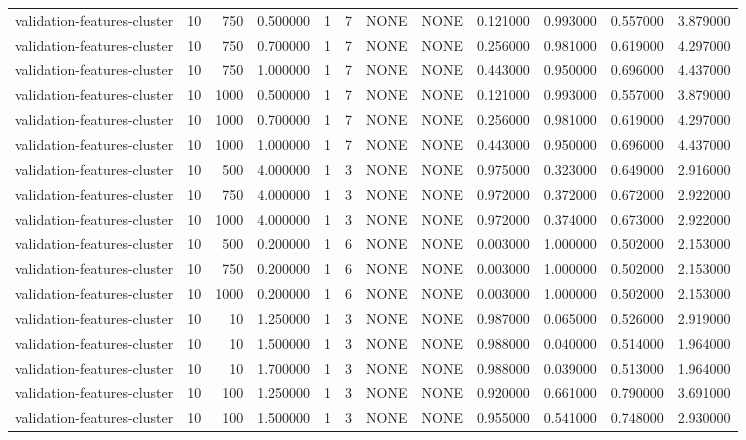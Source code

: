 \begin{tabular}{lrrrllllrrrr}
validation-features-cluster & 10 & 750 & 0.500000 & 1 & 7 & NONE & NONE & 0.121000 & 0.993000 & 0.557000 & 3.879000 \\
validation-features-cluster & 10 & 750 & 0.700000 & 1 & 7 & NONE & NONE & 0.256000 & 0.981000 & 0.619000 & 4.297000 \\
validation-features-cluster & 10 & 750 & 1.000000 & 1 & 7 & NONE & NONE & 0.443000 & 0.950000 & 0.696000 & 4.437000 \\
validation-features-cluster & 10 & 1000 & 0.500000 & 1 & 7 & NONE & NONE & 0.121000 & 0.993000 & 0.557000 & 3.879000 \\
validation-features-cluster & 10 & 1000 & 0.700000 & 1 & 7 & NONE & NONE & 0.256000 & 0.981000 & 0.619000 & 4.297000 \\
validation-features-cluster & 10 & 1000 & 1.000000 & 1 & 7 & NONE & NONE & 0.443000 & 0.950000 & 0.696000 & 4.437000 \\
validation-features-cluster & 10 & 500 & 4.000000 & 1 & 3 & NONE & NONE & 0.975000 & 0.323000 & 0.649000 & 2.916000 \\
validation-features-cluster & 10 & 750 & 4.000000 & 1 & 3 & NONE & NONE & 0.972000 & 0.372000 & 0.672000 & 2.922000 \\
validation-features-cluster & 10 & 1000 & 4.000000 & 1 & 3 & NONE & NONE & 0.972000 & 0.374000 & 0.673000 & 2.922000 \\
validation-features-cluster & 10 & 500 & 0.200000 & 1 & 6 & NONE & NONE & 0.003000 & 1.000000 & 0.502000 & 2.153000 \\
validation-features-cluster & 10 & 750 & 0.200000 & 1 & 6 & NONE & NONE & 0.003000 & 1.000000 & 0.502000 & 2.153000 \\
validation-features-cluster & 10 & 1000 & 0.200000 & 1 & 6 & NONE & NONE & 0.003000 & 1.000000 & 0.502000 & 2.153000 \\
validation-features-cluster & 10 & 10 & 1.250000 & 1 & 3 & NONE & NONE & 0.987000 & 0.065000 & 0.526000 & 2.919000 \\
validation-features-cluster & 10 & 10 & 1.500000 & 1 & 3 & NONE & NONE & 0.988000 & 0.040000 & 0.514000 & 1.964000 \\
validation-features-cluster & 10 & 10 & 1.700000 & 1 & 3 & NONE & NONE & 0.988000 & 0.039000 & 0.513000 & 1.964000 \\
validation-features-cluster & 10 & 100 & 1.250000 & 1 & 3 & NONE & NONE & 0.920000 & 0.661000 & 0.790000 & 3.691000 \\
validation-features-cluster & 10 & 100 & 1.500000 & 1 & 3 & NONE & NONE & 0.955000 & 0.541000 & 0.748000 & 2.930000 \\

\end{tabular}
